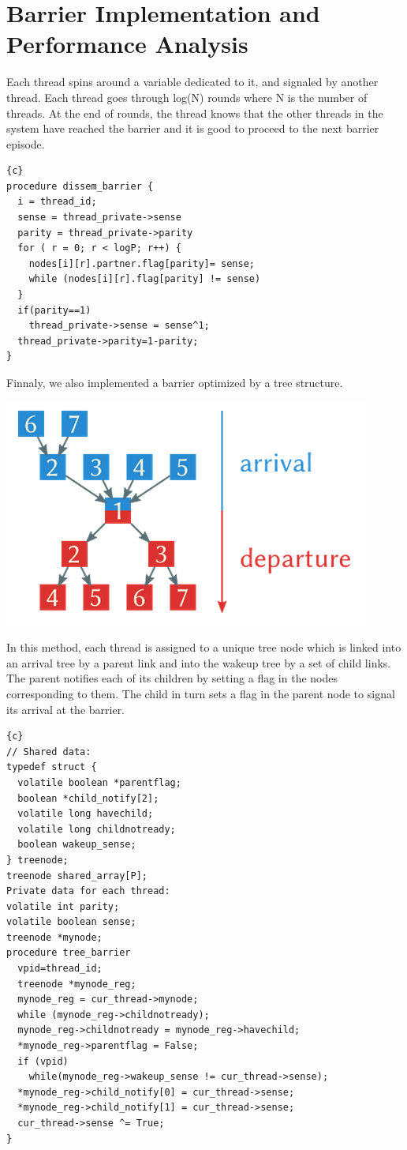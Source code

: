\documentclass{article}
\newcommand{\enterProblemHeader}[1]{
}
\newcommand{\exitProblemHeader}[1]{
}
\newcounter{homeworkProblemCounter} %
\newcommand{\homeworkProblemName}{}
\newenvironment{homeworkProblem}[1][Problem \arabic{homeworkProblemCounter}]{ %
\stepcounter{homeworkProblemCounter} %
\renewcommand{\homeworkProblemName}{#1} %
\section{\homeworkProblemName} %
}{
}
\begin{document}
\begin{homeworkProblem}[Barrier Implementation and Performance Analysis]
\begin{center}
\end{center}
Each thread spins
around a variable dedicated to it, and signaled by another thread. Each thread
goes through log(N) rounds where N is the number of threads. At the end of
rounds, the thread knows that the other threads in the system have reached the
barrier and it is good to proceed to the next barrier episode.
\begin{lstlisting}{c}
procedure dissem_barrier {
  i = thread_id;
  sense = thread_private->sense
  parity = thread_private->parity
  for ( r = 0; r < logP; r++) {
    nodes[i][r].partner.flag[parity]= sense;
    while (nodes[i][r].flag[parity] != sense)
  }
  if(parity==1)
    thread_private->sense = sense^1;
  thread_private->parity=1-parity;
}
\end{lstlisting}
Finnaly, we also implemented a barrier optimized by a tree structure.
\begin{center}
\includegraphics[width=0.5\columnwidth]{tree.png}
\end{center}
In this method, each thread is assigned to a unique tree node which is linked
into an arrival tree by a parent link and into the wakeup tree by a set of child
links. The parent notifies each of its children by setting a flag in the nodes
corresponding to them. The child in turn sets a flag in the parent node to
signal its arrival at the barrier.
\begin{lstlisting}{c}
// Shared data:
typedef struct {
  volatile boolean *parentflag;
  boolean *child_notify[2];
  volatile long havechild;
  volatile long childnotready;
  boolean wakeup_sense;
} treenode;
treenode shared_array[P];
Private data for each thread:
volatile int parity;
volatile boolean sense;
treenode *mynode;
procedure tree_barrier
  vpid=thread_id;
  treenode *mynode_reg;
  mynode_reg = cur_thread->mynode;
  while (mynode_reg->childnotready);
  mynode_reg->childnotready = mynode_reg->havechild;
  *mynode_reg->parentflag = False;
  if (vpid)
    while(mynode_reg->wakeup_sense != cur_thread->sense);
  *mynode_reg->child_notify[0] = cur_thread->sense;
  *mynode_reg->child_notify[1] = cur_thread->sense;
  cur_thread->sense ^= True;
}
\end{lstlisting}


\end{homeworkProblem}
\end{document}
